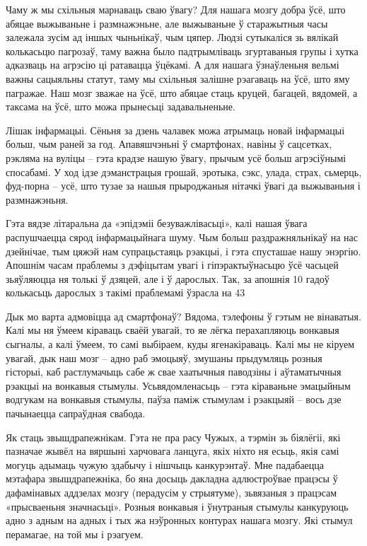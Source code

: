 Чаму ж мы схільныя марнаваць сваю ўвагу? Для нашага мозгу добра ўсё, што абяцае выжываньне і размнажэньне, але выжываньне ў старажытныя часы залежала зусім ад іншых чыньнікаў, чым цяпер. Людзі сутыкаліся зь вялікай колькасьцю пагрозаў, таму важна было падтрымліваць згуртаваныя групы і хутка адказваць на агрэсію ці ратавацца ўцёкамі. А для нашага ўзнаўленьня вельмі важны сацыяльны статут, таму мы схільныя залішне рэагаваць на ўсё, што яму пагражае. Наш мозг зважае на ўсё, што абяцае стаць круцей, багацей, вядомей, а таксама на ўсё, што можа прынесьці задавальненьне.

Лішак інфармацыі. Сёньня за дзень чалавек можа атрымаць новай інфармацыі больш, чым раней за год. Апавяшчэньні ў смартфонах, навіны ў сацсетках, рэкляма на вуліцы – гэта крадзе нашую ўвагу, прычым усё больш агрэсіўнымі спосабамі. У ход ідзе дэманстрацыя грошай, эротыка, сэкс, улада, страх, сьмерць, фуд-порна – усё, што тузае за нашыя прыроджаныя нітачкі ўвагі да выжываньня і размнажэньня.

Гэта вядзе літаральна да «эпідэміі безуважлівасьці», калі нашая ўвага распушчаецца сярод інфармацыйнага шуму. Чым больш раздражняльнікаў на нас дзейнічае, тым цяжэй нам супрацьстаяць рэакцыі, і гэта спусташае нашу энэргію. Апошнім часам праблемы з дэфіцытам увагі і гіпэрактыўнасьцю ўсё часьцей зьяўляюцца ня толькі ў дзяцей, але і ў дарослых. Так, за апошнія 10 гадоў колькасьць дарослых з такімі праблемамі ўзрасла на 43%

Дык мо варта адмовіцца ад смартфонаў? Вядома, тэлефоны ў гэтым не вінаватыя. Калі мы ня ўмеем кіраваць сваёй увагай, то яе лёгка перахапляюць вонкавыя сыгналы, а калі ўмеем, то самі выбіраем, куды ягенакіраваць. Калі мы не кіруем увагай, дык наш мозг – адно раб эмоцыяў, змушаны прыдумляць розныя гісторыі, каб растлумачыць сабе ж свае хаатычныя паводзіны і аўтаматычныя рэакцыі на вонкавыя стымулы. Усьвядомленасьць – гэта кіраваньне эмацыйным водгукам на вонкавыя стымулы, паўза паміж стымулам і рэакцыяй – вось дзе пачынаецца сапраўдная свабода.

Як стаць звышдрапежнікам. Гэта не пра расу Чужых, а тэрмін зь біялёгіі, які пазначае жывёл на вяршыні харчовага ланцуга, якіх ніхто ня есьць, якія самі могуць адымаць чужую здабычу і нішчыць канкурэнтаў. Мне падабаецца мэтафара звышдрапежніка, бо яна досыць дакладна адлюстроўвае працэсы ў дафамінавых аддзелах мозгу (перадусім у стрыятуме), зьвязаныя з працэсам «прысваеньня значнасьці». Розныя вонкавыя і ўнутраныя стымулы канкуруюць адно з адным на адных і тых жа нэўронных контурах нашага мозгу. Які стымул перамагае, на той мы і рэагуем.

